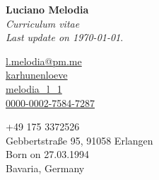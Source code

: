 \documentclass[a4paper,11pt]{article}
\begin{document}
{
  {
  \Huge \textbf{Luciano Melodia}}\\[0.1cm]
  \emph{Curriculum vitae}\\
  \emph{Last update on \today}.

  \begin{flushleft}
    \scriptsize
      \begin{minipage}{0.3\textwidth}
        {\footnotesize \faEnvelope} \hspace{0.1cm} \href{mailto:l.melodia@pm.me}{l.melodia@pm.me}\\[0.05cm]
        {\footnotesize \faGithub} \hspace{0.15cm} \href{https://github.com/karhunenloeve}{karhunenloeve}\\[0.05cm]
        {\footnotesize \aiarXiv} \hspace{0.1cm} \href{https://arxiv.org/a/melodia_l_1}{melodia\_l\_1}\\[0.05cm]
        {\footnotesize \aiOrcid} \hspace{0.1cm} \href{https://orcid.org/0000-0002-7584-7287}{0000-0002-7584-7287}
      \end{minipage}
      \begin{minipage}{0.4\textwidth}
        {\footnotesize \faPhone} \hspace{0.15cm} +49 175 3372526 \\[0.05cm]
        {\footnotesize \faMapPin} \hspace{0.23cm} Gebbertstraße 95, 91058 Erlangen\\[0.05cm]
        {\footnotesize \faMars} \hspace{0.1cm} Born on 27.03.1994\\[0.05cm]
        {\footnotesize \faMapO} \hspace{0.1cm} Bavaria, Germany
      \end{minipage}
  \end{flushleft}
}

\end{document}
